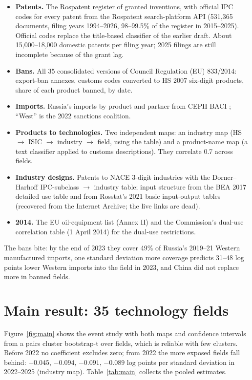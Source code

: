 \documentclass[11pt,a4paper]{article}
\begin{document}
\begin{itemize}\setlength\itemsep{0.15em}
  \item \textbf{Patents.} The Rospatent register of granted inventions, with official IPC codes for every patent from
  the Rospatent search-platform API (531,365 documents, filing years 1994--2026, 98--99.5\% of the register in
  2015--2025). Official codes replace the title-based classifier of the earlier draft. About 15,000--18,000 domestic
  patents per filing year; 2025 filings are still incomplete because of the grant lag.
  \item \textbf{Bans.} All 35 consolidated versions of Council Regulation (EU) 833/2014: export-ban annexes, customs
  codes converted to HS 2007 six-digit products, share of each product banned, by date.
  \item \textbf{Imports.} Russia's imports by product and partner from CEPII BACI \citep{GaulierZignago2010}; ``West''
  is the 2022 sanctions coalition.
  \item \textbf{Products to technologies.} Two independent maps: an industry map (HS $\to$ ISIC $\to$ industry
  $\to$ field, using the \citealp{DornerHarhoff2018} table) and a product-name map (a text classifier applied to
  customs descriptions). They correlate 0.7 across fields.
  \item \textbf{Industry designs.} Patents to NACE 3-digit industries with the Dorner--Harhoff IPC-subclass $\to$
  industry table; input structure from the BEA 2017 detailed use table and from Rosstat's 2021 basic input-output
  tables (recovered from the Internet Archive; the live links are dead).
  \item \textbf{2014.} The EU oil-equipment list (Annex II) and the Commission's dual-use correlation table
  (1 April 2014) for the dual-use restrictions.
\end{itemize}
The bans bite: by the end of 2023 they cover 49\% of Russia's 2019--21 Western manufactured imports, one standard
deviation more coverage predicts 31--48 log points lower Western imports into the field in 2023, and China did not
replace more in banned fields.

\section{Main result: 35 technology fields}

Figure~\ref{fig:main} shows the event study with both maps and confidence intervals from a pairs cluster
bootstrap-t over fields, which is reliable with few clusters. Before 2022 no coefficient excludes zero; from 2022 the
more exposed fields fall behind: $-0.045$, $-0.094$, $-0.091$, $-0.089$ log points per standard deviation in
2022--2025 (industry map). Table~\ref{tab:main} collects the pooled estimates.
\end{document}
